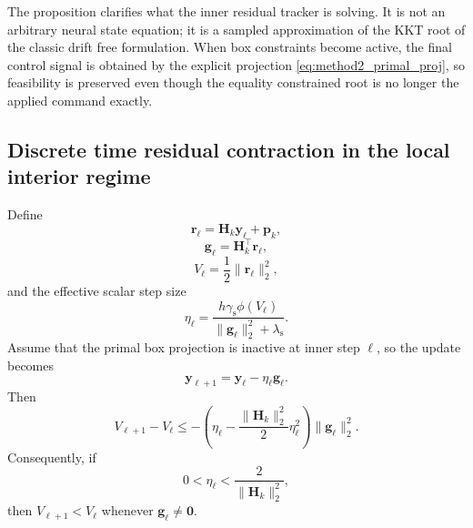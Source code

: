 The proposition clarifies what the inner residual tracker is solving. It is not an arbitrary neural state equation; it is a sampled approximation of the KKT root of the classic drift free formulation. When box constraints become active, the final control signal is obtained by the explicit projection \eqref{eq:method2_primal_proj}, so feasibility is preserved even though the equality constrained root is no longer the applied command exactly.

\subsection{Discrete time residual contraction in the local interior regime}

\begin{proposition}
Define
\begin{equation}
  \bm{r}_\ell = \bm{H}_k \bm{y}_\ell + \bm{p}_k,
\end{equation}
\begin{equation}
  \bm{g}_\ell = \bm{H}_k^\top \bm{r}_\ell,
\end{equation}
\begin{equation}
  V_\ell = \frac{1}{2}\|\bm{r}_\ell\|_2^2,
\end{equation}
and the effective scalar step size
\begin{equation}
  \eta_\ell
  =
  \frac{h\gamma_{\mathrm{s}}\phi(V_\ell)}
  {\|\bm{g}_\ell\|_2^2 + \lambda_{\mathrm{s}}}.
  \label{eq:eta_ell}
\end{equation}
Assume that the primal box projection is inactive at inner step $\ell$, so the update becomes
\begin{equation}
  \bm{y}_{\ell+1} = \bm{y}_\ell - \eta_\ell \bm{g}_\ell.
  \label{eq:inner_unprojected}
\end{equation}
Then
\begin{equation}
  V_{\ell+1} - V_\ell
  \le
  -
  \left(
    \eta_\ell - \frac{\|\bm{H}_k\|_2^2}{2}\eta_\ell^2
  \right)
  \|\bm{g}_\ell\|_2^2.
  \label{eq:V_contract}
\end{equation}
Consequently, if
\begin{equation}
  0 < \eta_\ell < \frac{2}{\|\bm{H}_k\|_2^2},
  \label{eq:eta_cond}
\end{equation}
then $V_{\ell+1} < V_\ell$ whenever $\bm{g}_\ell \neq \bm{0}$.
\end{proposition}

